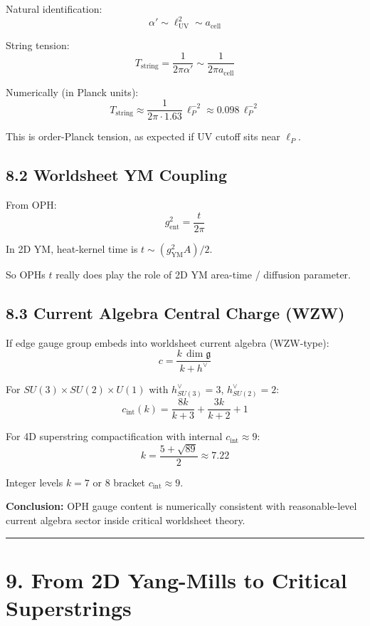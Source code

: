 Natural identification: \[\alpha' \sim \ell_{\text{UV}}^2 \sim a_{\text{cell}}\]

String tension: \[T_{\text{string}} = \frac{1}{2\pi\alpha'} \sim \frac{1}{2\pi a_{\text{cell}}}\]

Numerically (in Planck units): \[T_{\text{string}} \approx \frac{1}{2\pi \cdot 1.63} \, \ell_P^{-2} \approx 0.098 \, \ell_P^{-2}\]

This is order-Planck tension, as expected if UV cutoff sits near \(\ell_P\).

\subsection{8.2 Worldsheet YM Coupling}\label{82-worldsheet-ym-coupling}

From OPH: \[g_{\text{ent}}^2 = \frac{t}{2\pi}\]

In 2D YM, heat-kernel time is \(t \sim (g_{\text{YM}}^2 A)/2\).

So OPH\textquotesingle s \(t\) really does play the role of 2D YM area-time / diffusion parameter.

\subsection{8.3 Current Algebra Central Charge (WZW)}\label{83-current-algebra-central-charge-wzw}

If edge gauge group embeds into worldsheet current algebra (WZW-type): \[c = \frac{k \, \dim\mathfrak{g}}{k + h^\vee}\]

For \(SU(3) \times SU(2) \times U(1)\) with \(h^\vee_{SU(3)} = 3\), \(h^\vee_{SU(2)} = 2\): \[c_{\text{int}}(k) = \frac{8k}{k+3} + \frac{3k}{k+2} + 1\]

For 4D superstring compactification with internal \(c_{\text{int}} \approx 9\): \[k = \frac{5 + \sqrt{89}}{2} \approx 7.22\]

Integer levels \(k = 7\) or \(8\) bracket \(c_{\text{int}} \approx 9\).

\textbf{Conclusion:} OPH gauge content is numerically consistent with reasonable-level current algebra sector inside critical worldsheet theory.

\begin{center}\rule{0.5\linewidth}{0.5pt}\end{center}

\section{9. From 2D Yang-Mills to Critical Superstrings}\label{9-from-2d-yang-mills-to-critical-superstrings}

